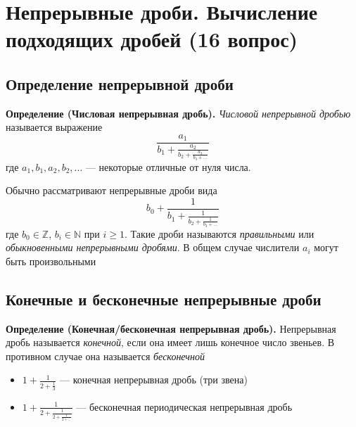 \documentclass[a4paper,12pt]{article}
\theoremstyle{definition}
\theoremstyle{plain}
\theoremstyle{remark}
\begin{document}
	
	
	
	
	
	
	\newpage
	\section{Непрерывные дроби. Вычисление подходящих дробей (16 вопрос)}
	
	\subsection{Определение непрерывной дроби}
	
	\noindent \textbf{Определение (Числовая непрерывная дробь).}
	\textit{Числовой непрерывной дробью} называется выражение
	\[
	\frac{a_1}{b_1 + \frac{a_2}{b_2 + \frac{a_3}{b_3 + \dots}}} \tag{1}
	\]
	где $a_1, b_1, a_2, b_2, \dots$ — некоторые отличные от нуля числа.
	
	\begin{tcolorbox}[colback=blue!5, colframe=blue!40!black, title=Замечание об обозначениях]
		Обычно рассматривают непрерывные дроби вида
		\[
		b_0 + \frac{1}{b_1 + \frac{1}{b_2 + \frac{1}{b_3 + \dots}}}
		\]
		где $b_0 \in \mathbb{Z}$, $b_i \in \mathbb{N}$ при $i \geq 1$. Такие дроби называются \textit{правильными} или \textit{обыкновенными непрерывными дробями}. В общем случае числители $a_i$ могут быть произвольными
	\end{tcolorbox}
	
	\subsection{Конечные и бесконечные непрерывные дроби}
	
	\noindent \textbf{Определение (Конечная/бесконечная непрерывная дробь).}
	Непрерывная дробь называется \textit{конечной}, если она имеет лишь конечное число звеньев. В противном случае она называется \textit{бесконечной}
	
	\begin{tcolorbox}[colback=gray!5, colframe=gray!50, title=Примеры]
		\begin{itemize}
			\item $1 + \frac{1}{2 + \frac{1}{3}}$ — конечная непрерывная дробь (три звена)
			\item $1 + \frac{1}{2 + \frac{1}{2 + \frac{1}{2 + \dots}}}$ — бесконечная периодическая непрерывная дробь
		\end{itemize}
	\end{tcolorbox}
	
\end{document}

